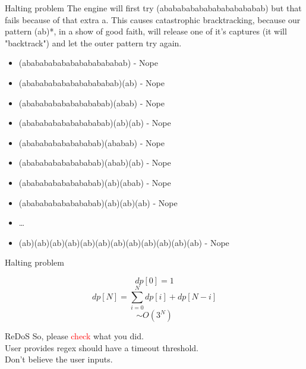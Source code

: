 \documentclass{beamer}
\begin{document}
\begin{CJK*}{UTF8}{bsmi}
    \begin{frame}{Halting problem}
        The engine will first try (abababababababababababab) but that
        fails because of that extra a. This causes catastrophic bracktracking,
        because our pattern (ab)*, in a show of good faith, will release
        one of it's captures (it will "backtrack") and let the outer
        pattern try again.
        \begin{itemize}
            \item (abababababababababababab) - Nope
            \item (ababababababababababab)(ab) - Nope
            \item (abababababababababab)(abab) - Nope
            \item (abababababababababab)(ab)(ab) - Nope
            \item (ababababababababab)(ababab) - Nope
            \item (ababababababababab)(abab)(ab) - Nope
            \item (ababababababababab)(ab)(abab) - Nope
            \item (ababababababababab)(ab)(ab)(ab) - Nope
            \item \dots
            \item (ab)(ab)(ab)(ab)(ab)(ab)(ab)(ab)(ab)(ab)(ab)(ab) - Nope
        \end{itemize}
    \end{frame}

    \begin{frame}{Halting problem}
        \begin{center}
            \LARGE
            $$dp[0] = 1$$
            $$dp[N]=\sum^{N}_{i=0}{dp[i] + dp[N-i]} $$
            $$\sim O(3^N) $$
        \end{center}
    \end{frame}

    \begin{frame}{ReDoS}
        So, please \textcolor{red}{check} what you did.\\
        User provides regex should have a timeout threshold.\\
        Don't believe the user inputs.
    \end{frame}


\end{CJK*}
\end{document}
